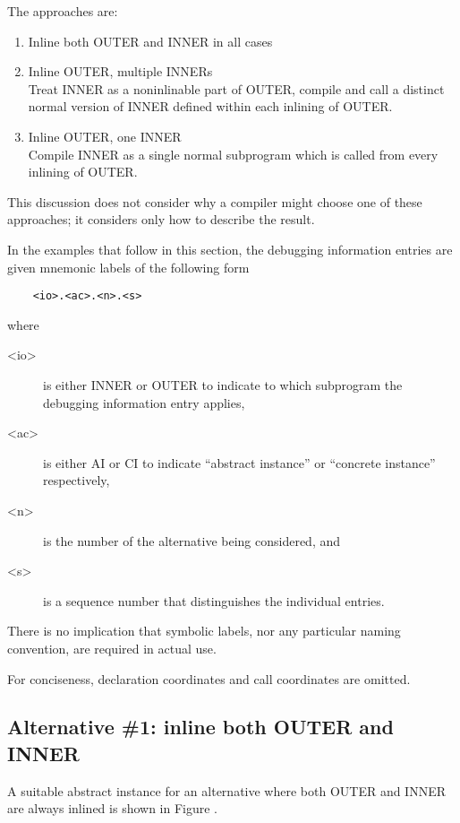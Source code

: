 The approaches are:
\begin{enumerate}[1. ]
\item  Inline both OUTER and INNER in all cases

\item Inline OUTER, multiple INNERs \\
Treat INNER as a non\dash inlinable part of OUTER, compile and
call a distinct normal version of INNER defined within each
inlining of OUTER.

\item Inline OUTER, one INNER \\
Compile INNER as a single normal subprogram which is called
from every inlining of OUTER.
\end{enumerate}

This discussion does not consider why a compiler might choose
one of these approaches; it considers only how to describe
the result.

In the examples that follow in this section, the debugging
information entries are given mnemonic labels of the following
form
\begin{verbatim}
    <io>.<ac>.<n>.<s>
\end{verbatim}
where
\begin{description}
\item[\textless io\textgreater]
is either INNER or OUTER to indicate to which
subprogram the debugging information entry applies, 
\item[\textless ac\textgreater]
is either AI or CI to indicate ``abstract instance'' or
``concrete instance'' respectively, 
\item[\textless n\textgreater]
is the number of the
alternative being considered, and 
\item[\textless s\textgreater]
is a sequence number that
distinguishes the individual entries. 
\end{description}
There is no implication
that symbolic labels, nor any particular naming convention,
are required in actual use.

For conciseness, declaration coordinates and call coordinates are omitted.

\subsection{Alternative \#1: inline both OUTER and INNER}
\label{app:inlinebothouterandinner}

A suitable abstract instance for an alternative where both
OUTER and INNER are always inlined is shown in 
Figure .


